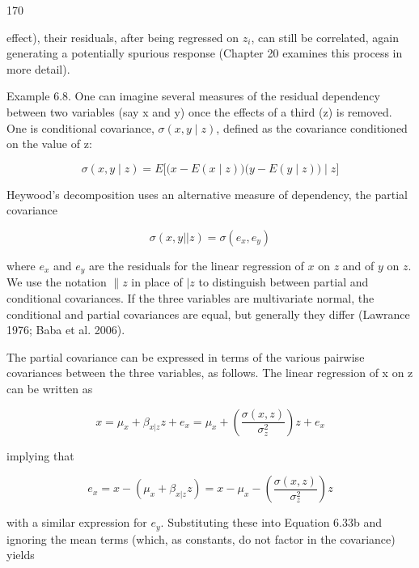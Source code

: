 \documentclass{article}
\begin{document}
170

effect), their residuals, after being regressed on  $ z_{i} $, can still be correlated, again generating a potentially spurious response (Chapter 20 examines this process in more detail).

Example 6.8. One can imagine several measures of the residual dependency between two variables (say x and y) once the effects of a third (z) is removed. One is conditional covariance,  $ \sigma(x, y \mid z) $, defined as the covariance conditioned on the value of z:

\begin{equation}
\sigma(x,y\mid z)=E\Biggl[\biggl(x-E(x\mid z)\biggr)\biggl(y-E(y\mid z)\biggr)\mid z\Biggr]
\tag{6.33a}
\label{eq:6_33a}
\end{equation}

Heywood’s decomposition uses an alternative measure of dependency, the partial covariance

\begin{equation}
\sigma(x,y||z)=\sigma(e_{x},e_{y})
\tag{6.33b}
\label{eq:6_33b}
\end{equation}

where  $ e_x $ and  $ e_y $ are the residuals for the linear regression of  $ x $ on  $ z $ and of  $ y $ on  $ z $. We use the notation  $ \|z $ in place of  $ |z $ to distinguish between partial and conditional covariances. If the three variables are multivariate normal, the conditional and partial covariances are equal, but generally they differ (Lawrance 1976; Baba et al. 2006).

The partial covariance can be expressed in terms of the various pairwise covariances between the three variables, as follows. The linear regression of x on z can be written as

\begin{equation}
x=\mu_{x}+\beta_{x|z}z+e_{x}=\mu_{x}+\left(\frac{\sigma(x,z)}{\sigma_{z}^{2}}\right)z+e_{x}
\end{equation}

implying that

\begin{equation}
e_{x}=x-\left(\mu_{x}+\beta_{x|z}z\right)=x-\mu_{x}-\left(\frac{\sigma(x,z)}{\sigma_{z}^{2}}\right)z
\tag{6.33c}
\label{eq:6_33c}
\end{equation}

with a similar expression for  $ e_{y} $. Substituting these into Equation 6.33b and ignoring the mean terms (which, as constants, do not factor in the covariance) yields
\end{document}
